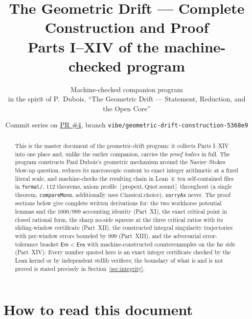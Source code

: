 \documentclass[11pt]{article}
\title{The Geometric Drift --- Complete Construction and Proof\\
\large Parts I--XIV of the machine-checked program}
\author{Machine-checked companion program\\
\small in the spirit of P.~Dubois, ``The Geometric Drift --- Statement, Reduction, and the Open Core''}
\date{Commit series on \href{https://github.com/duboispaulihp-sys/pauldubois/pull/4}{PR \#4}, branch \texttt{vibe/geometric-drift-construction-5368e9}}
\theoremstyle{plain}
\theoremstyle{definition}
\begin{document}
\maketitle

\begin{abstract}
This is the master document of the geometric-drift program: it collects Parts I--XIV into
one place and, unlike the earlier companion, carries the \emph{proof bodies} in full. The
program constructs Paul Dubois's geometric mechanism around the Navier--Stokes blow-up
question, reduces its macroscopic content to exact integer arithmetic at a fixed literal
scale, and machine-checks the resulting chain in Lean~4: ten self-contained files in
\texttt{formal/}, $112$ theorems, axiom profile $[\mathrm{propext},\mathrm{Quot.sound}]$
throughout (a single theorem, \texttt{compareMono}, additionally uses
$\mathrm{Classical.choice}$), \texttt{sorryAx} never. The proof sections below give
complete written derivations for: the two workhorse potential lemmas and the
$1000/999$ accounting identity (Part~XI), the exact critical point in closed rational form,
the sharp no-side squeeze at the three critical ratios with its sliding-window certificate
(Part~XII), the constructed integral singularity trajectories with per-window errors
bounded by $999$ (Part~XIII), and the adversarial error-tolerance bracket
$\mathsf{Em} < \mathsf{Ens}$ with machine-constructed counterexamples on the far side
(Part~XIV). Every number quoted here is an exact integer certificate checked by the Lean
kernel or by independent stdlib verifiers; the boundary of what is and is not proved is
stated precisely in Section~\ref{sec:integrity}.
\end{abstract}

\section{How to read this document}\label{sec:readme}
\end{document}

